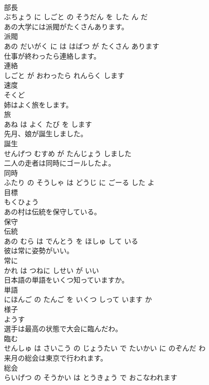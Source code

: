 \documentclass[8pt]{extreport}
\begin{document}
\begin{CJK}{UTF8}{min}
\\	部長 
\\	ぶちょう に しごと の そうだん を した ん だ			
\\	あの大学には派閥がたくさんあります。	
\\	派閥 
\\	あの だいがく に は はばつ が たくさん あります			
\\	仕事が終わったら連絡します。	
\\	連絡 
\\	しごと が おわったら れんらく します			
\\	速度	
\\	そくど			
\\	姉はよく旅をします。	
\\	旅 
\\	あね は よく たび を します			
\\	先月、娘が誕生しました。	
\\	誕生 
\\	せんげつ むすめ が たんじょう しました			
\\	二人の走者は同時にゴールしたよ。	
\\	同時 
\\	ふたり の そうしゃ は どうじ に ごーる した よ			
\\	目標	
\\	もくひょう			
\\	あの村は伝統を保守している。	
\\	保守 
\\	伝統 
\\	あの むら は でんとう を ほしゅ して いる			
\\	彼は常に姿勢がいい。	
\\	常に 
\\	かれ は つねに しせい が いい			
\\	日本語の単語をいくつ知っていますか。	
\\	単語 
\\	にほんご の たんご を いくつ しって います か			
\\	様子	
\\	ようす			
\\	選手は最高の状態で大会に臨んだわ。	
\\	臨む 
\\	せんしゅ は さいこう の じょうたい で たいかい に のぞんだ わ			
\\	来月の総会は東京で行われます。	
\\	総会 
\\	らいげつ の そうかい は とうきょう で おこなわれます			

\end{CJK}
\end{document}
